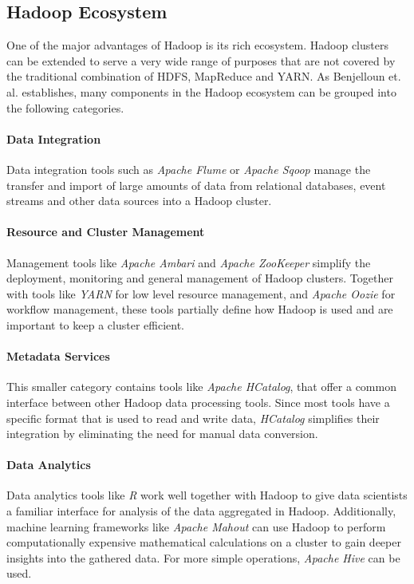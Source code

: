 \subsection{Hadoop Ecosystem}
\label{hadoop-ecosystem}

One of the major advantages of Hadoop is its rich ecosystem. 
Hadoop clusters can be extended to serve a very wide range of purposes 
that are not covered by the traditional combination of \ac{HDFS}, MapReduce and \ac{YARN}.
As Benjelloun et. al. establishes, many components in the Hadoop ecosystem 
can be grouped into the following categories.\autocite{7105553}

\paragraph{Data Integration}
Data integration tools such as \emph{Apache Flume} or \emph{Apache Sqoop} manage the transfer 
and import of large amounts of data from relational databases\autocite{apache2018sqoop}, 
event streams and other data sources\autocite{apache2017flume} into a Hadoop cluster.

\paragraph{Resource and Cluster Management}
Management tools like \emph{Apache Ambari} and \emph{Apache ZooKeeper} simplify the deployment, 
monitoring and general management of Hadoop clusters. 
Together with tools like \emph{\ac{YARN}} for low level resource management, 
and \emph{Apache Oozie} for workflow management, these tools partially define how Hadoop is used 
and are important to keep a cluster efficient.

\paragraph{Metadata Services}
This smaller category contains tools like \emph{Apache HCatalog}, 
that offer a common interface between other Hadoop data processing tools. 
Since most tools have a specific format that is used to read and write data, 
\emph{HCatalog} simplifies their integration by eliminating 
the need for manual data conversion.\autocite{bmc2017hcatalog}

\paragraph{Data Analytics}
Data analytics tools like \emph{R} work well together with Hadoop to give data scientists 
a familiar interface for analysis of the data aggregated in Hadoop. 
Additionally, machine learning frameworks like \emph{Apache Mahout} can use Hadoop 
to perform computationally expensive mathematical calculations 
on a cluster to gain deeper insights into the gathered data. 
For more simple operations, \emph{Apache Hive} can be used.

